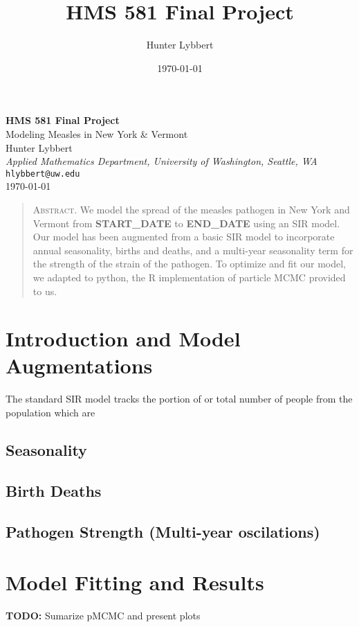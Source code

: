 \documentclass[11pt]{amsart}
\title{HMS 581 Final Project}
\author{Hunter Lybbert}
\date{\today}
\begin{document}
\begin{center}
    {\LARGE \textbf{HMS 581 Final Project}}\\[1ex]
    {\large Modeling Measles in New York \& Vermont}\\[4ex]
    {\Large Hunter Lybbert}\\[2ex]
    \textit{Applied Mathematics Department, University of Washington, Seattle, WA}\\[1ex]
    \texttt{hlybbert@uw.edu}\\[1ex]
    \today
\end{center}

\vspace{2ex}
\begin{quote}
A\textsc{bstract.}
\small We model the spread of the measles pathogen in New York and Vermont from \textbf{START\_DATE} to \textbf{END\_DATE} using an SIR model.
Our model has been augmented from a basic SIR model to incorporate annual seasonality, births and deaths, and a multi-year seasonality term for the strength of the strain of the pathogen.
To optimize and fit our model, we adapted to python, the R implementation of particle MCMC provided to us.
\end{quote}

\section{Introduction and Model Augmentations}\label{sec:augmentations}
The standard SIR model tracks the portion of or total number of people from the population which are 
\subsection{Seasonality}
\subsection{Birth Deaths}
\subsection{Pathogen Strength (Multi-year oscilations)}

\section{Model Fitting and Results}\label{sec:results}
\textbf{TODO:} Sumarize pMCMC and present plots
\end{document}
